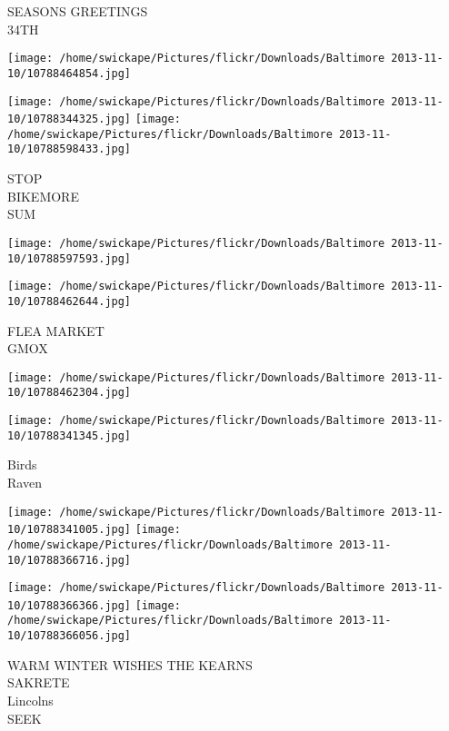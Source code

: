 \documentclass[10pt,letterpaper]{article}
\begin{document}
SEASONS GREETINGS\\
34TH\\
\pagebreak

\texttt{[image: /home/swickape/Pictures/flickr/Downloads/Baltimore 2013-11-10/10788464854.jpg]}

\vspace{0.25in}
\texttt{[image: /home/swickape/Pictures/flickr/Downloads/Baltimore 2013-11-10/10788344325.jpg]}
\texttt{[image: /home/swickape/Pictures/flickr/Downloads/Baltimore 2013-11-10/10788598433.jpg]}

STOP\\
BIKEMORE\\
SUM\\
\pagebreak

\texttt{[image: /home/swickape/Pictures/flickr/Downloads/Baltimore 2013-11-10/10788597593.jpg]}

\vspace{0.25in}
\texttt{[image: /home/swickape/Pictures/flickr/Downloads/Baltimore 2013-11-10/10788462644.jpg]}

FLEA MARKET\\
GMOX\\
\pagebreak

\texttt{[image: /home/swickape/Pictures/flickr/Downloads/Baltimore 2013-11-10/10788462304.jpg]}

\vspace{0.25in}
\texttt{[image: /home/swickape/Pictures/flickr/Downloads/Baltimore 2013-11-10/10788341345.jpg]}

Birds\\
Raven\\
\pagebreak

\texttt{[image: /home/swickape/Pictures/flickr/Downloads/Baltimore 2013-11-10/10788341005.jpg]}
\texttt{[image: /home/swickape/Pictures/flickr/Downloads/Baltimore 2013-11-10/10788366716.jpg]}

\texttt{[image: /home/swickape/Pictures/flickr/Downloads/Baltimore 2013-11-10/10788366366.jpg]}
\texttt{[image: /home/swickape/Pictures/flickr/Downloads/Baltimore 2013-11-10/10788366056.jpg]}

WARM WINTER WISHES THE KEARNS\\
SAKRETE\\
Lincolns\\
SEEK\\
\pagebreak
\end{document}
